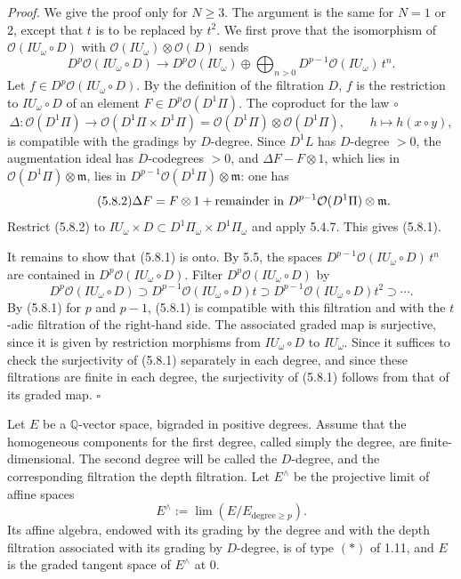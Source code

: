 \documentclass[10pt,a4paper]{article}
\newcommand{\Q}{\mathbb Q}
\newcommand{\OO}{\mathcal O}
\newcommand{\limproj}{\operatorname*{lim}}
\theoremstyle{deligne}
\newenvironment{proofdel}{\textit{Proof.}}{\hfill$\square$}
\newcommand{\heading}[1]{\vspace{0.65em}\noindent{\bfseries #1}\quad}
\begin{document}
\begin{proofdel}
We give the proof only for \(N\ge3\). The argument is the same for \(N=1\) or \(2\), except that \(t\) is to be replaced by \(t^2\). We first prove that the isomorphism of \(\OO(IU_\omega\circ D)\) with \(\OO(IU_\omega)\otimes\OO(D)\) sends
\[
\tag{5.8.1}
D^p\OO(IU_\omega\circ D)
\longrightarrow
D^p\OO(IU_\omega)\oplus\bigoplus_{n>0}D^{p-1}\OO(IU_\omega)\,t^n.
\]
Let \(f\in D^p\OO(IU_\omega\circ D)\). By the definition of the filtration \(D\), \(f\) is the restriction to \(IU_\omega\circ D\) of an element \(F\in D^p\OO(D^1\Pi)\). The coproduct for the law \(\circ\)
\[
\Delta:\OO(D^1\Pi)\longrightarrow\OO(D^1\Pi\times D^1\Pi)
=\OO(D^1\Pi)\otimes\OO(D^1\Pi),\qquad h\longmapsto h(x\circ y),
\]
is compatible with the gradings by \(D\)-degree. Since \(D^1L\) has \(D\)-degree \(>0\), the augmentation ideal has \(D\)-codegrees \(>0\), and \(\Delta F-F\otimes1\), which lies in \(\OO(D^1\Pi)\otimes\mathfrak m\), lies in \(D^{p-1}\OO(D^1\Pi)\otimes\mathfrak m\): one has
\[
\tag{5.8.2}
\Delta F=F\otimes1+\hbox{remainder in }D^{p-1}\OO(D^1\Pi)\otimes\mathfrak m.
\]
Restrict (5.8.2) to \(IU_\omega\times D\subset D^1\Pi_\omega\times D^1\Pi_\omega\) and apply 5.4.7. This gives (5.8.1).

It remains to show that (5.8.1) is onto. By 5.5, the spaces \(D^{p-1}\OO(IU_\omega\circ D)\,t^n\) are contained in \(D^p\OO(IU_\omega\circ D)\). Filter \(D^p\OO(IU_\omega\circ D)\) by
\[
D^p\OO(IU_\omega\circ D)\supset
D^{p-1}\OO(IU_\omega\circ D)t\supset
D^{p-1}\OO(IU_\omega\circ D)t^2\supset\cdots .
\]
By (5.8.1) for \(p\) and \(p-1\), (5.8.1) is compatible with this filtration and with the \(t\)-adic filtration of the right-hand side. The associated graded map is surjective, since it is given by restriction morphisms from \(IU_\omega\circ D\) to \(IU_\omega\). Since it suffices to check the surjectivity of (5.8.1) separately in each degree, and since these filtrations are finite in each degree, the surjectivity of (5.8.1) follows from that of its graded map.
\end{proofdel}

\heading{5.9.} Let \(E\) be a \(\Q\)-vector space, bigraded in positive degrees. Assume that the homogeneous components for the first degree, called simply the degree, are finite-dimensional. The second degree will be called the \(D\)-degree, and the corresponding filtration the depth filtration. Let \(E^\wedge\) be the projective limit of affine spaces
\[
E^\wedge:=\limproj(E/E_{\mathrm{degree}\ge p}).
\]
Its affine algebra, endowed with its grading by the degree and with the depth filtration associated with its grading by \(D\)-degree, is of type \((*)\) of 1.11, and \(E\) is the graded tangent space of \(E^\wedge\) at \(0\).
\end{document}
